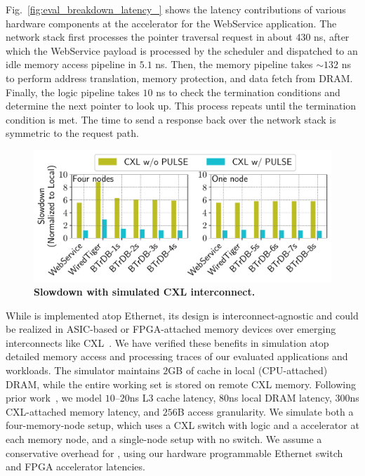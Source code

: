 Fig.~\ref{fig:eval_breakdown_latency_} shows the latency contributions of various hardware components at the \pulse accelerator for the WebService application. The network stack first processes the pointer traversal request in about $430$ ns, after which the WebService payload is processed by the scheduler and dispatched to an idle memory access pipeline in $5.1$ ns. Then, the memory pipeline takes $\sim$$132$ ns to perform address translation, memory protection, and data fetch from DRAM. Finally, the logic pipeline takes $10$ ns to check the termination conditions and determine the next pointer to look up. This process repeats until the termination condition is met. The time to send a response back over the network stack is symmetric to the request path.












\begin{figure}[t]
\centering
\includegraphics[width=0.9\columnwidth]{fig/pulse/cxl.pdf}
\caption[Slowdown with simulated CXL interconnect]{\textbf{Slowdown with simulated CXL interconnect.} }

\label{fig:eval_cxl}
\end{figure}

While \pulse is implemented atop Ethernet, its design is interconnect-agnostic and could be realized in ASIC-based or FPGA-attached memory devices over emerging interconnects like CXL~\cite{cxl, cxl_azure, sun2023demystifying}. We have verified these benefits in simulation atop detailed memory access and processing traces of our evaluated applications and workloads. The simulator maintains $2$GB of cache in local (CPU-attached) DRAM, while the entire working set is stored on remote CXL memory. Following prior work~\cite{pond}, we model $10$--$20$ns L3 cache latency, $80$ns local DRAM latency, $300$ns CXL-attached memory latency, and $256$B access granularity. We simulate both a four-memory-node setup, which uses a CXL switch with \pulse logic and a \pulse accelerator at each memory node, and a single-node setup with no switch. We assume a conservative overhead for \pulse, using our hardware programmable Ethernet switch and FPGA accelerator latencies.
 
